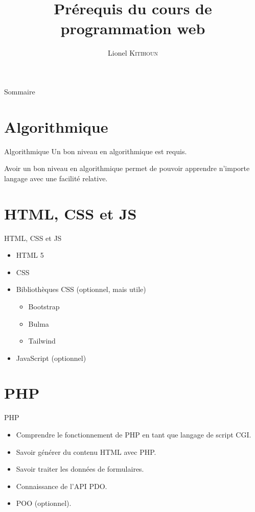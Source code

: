 \documentclass{beamer}
\title{Prérequis du cours de programmation web}
\date{}
\author{Lionel \textsc{Kitihoun}}
\begin{document}
\begin{frame}[plain]
\maketitle
\end{frame}

\begin{frame}{Sommaire}
\tableofcontents
\end{frame}

\section{Algorithmique}

\begin{frame}{Algorithmique}
Un bon niveau en algorithmique est requis.

Avoir un bon niveau en algorithmique permet de pouvoir apprendre n'importe langage avec une facilité relative.
\end{frame}

\section{HTML, CSS et JS}
\begin{frame}{HTML, CSS et JS}
\begin{itemize}
  \item HTML 5
  \item CSS
  \item Bibliothèques CSS (optionnel, mais utile)
  \begin{itemize}
    \item Bootstrap
    \item Bulma
    \item Tailwind
  \end{itemize}
  \item JavaScript (optionnel)
\end{itemize}
\end{frame}

\section{PHP}
\begin{frame}{PHP}
\begin{center}
  \begin{itemize}
    \item Comprendre le fonctionnement de PHP en tant que langage de script CGI.
    \item Savoir générer du contenu HTML avec PHP.
    \item Savoir traiter les données de formulaires.
    \item Connaissance de l'API PDO.
    \item POO (optionnel).
  \end{itemize}
\end{center}
\end{frame}
\end{document}
